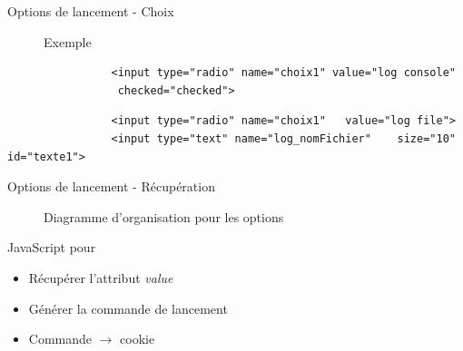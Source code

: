 \documentclass{beamer}
\begin{document}
\begin{frame}[fragile]{\textcolor{bleu2}{\hspace{1cm}Options de lancement - Choix}}
	\begin{figure}
		\begin{center}
			\caption{Exemple}
		\end{center}
	\end{figure}
	\scriptsize
	\begin{center}
		\begin{minipage}[c]{0.9\textwidth}
			\begin{verbatim}
				<input type="radio" name="choix1" value="log console"
				 checked="checked">
			\end{verbatim}
			\begin{verbatim}
				<input type="radio" name="choix1" 	value="log file">
				<input type="text" name="log_nomFichier" 	size="10" id="texte1">
			\end{verbatim}
		\end{minipage}
	\end{center}
\end{frame}

\begin{frame}{\textcolor{bleu2}{\hspace{1cm}Options de lancement - Récupération}}
	\begin{figure}
		\begin{center}
			\caption{Diagramme d'organisation pour les options}
		\end{center}
	\end{figure}
	\begin{block}{\hspace{0.2cm}JavaScript pour}
		\begin{itemize}
			\item Récupérer l'attribut \textit{value} 
			\item Générer la commande de lancement 
			\item Commande $\rightarrow$ cookie
		\end{itemize}
	\end{block}
\end{frame}
\end{document}
